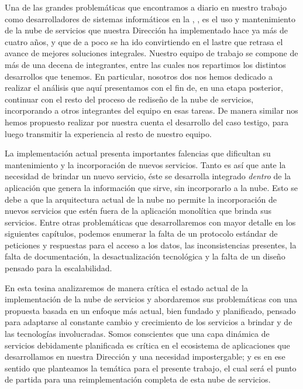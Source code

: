 
Una de las grandes problemáticas que encontramos a diario en nuestro trabajo como desarrolladores de sistemas informáticos en la \direccionDesarrollo, \unlp, es el uso y mantenimiento de la nube de servicios que nuestra Dirección ha implementado hace ya más de cuatro años, y que de a poco se ha ido convirtiendo en el lastre que retrasa el avance de mejores soluciones integrales. Nuestro equipo de trabajo se compone de más de una decena de integrantes, entre las cuales nos repartimos los distintos desarrollos que tenemos. En particular, nosotros dos nos hemos dedicado a realizar el análisis que aquí presentamos con el fin de, en una etapa posterior, continuar con el resto del proceso de rediseño de la nube de servicios, incorporando a otros integrantes del equipo en esas tareas. De manera similar nos hemos propuesto realizar por nuestra cuenta el desarrollo del caso testigo, para luego transmitir la experiencia al resto de nuestro equipo.

La implementación actual presenta importantes falencias que dificultan su mantenimiento y la incorporación de nuevos servicios. Tanto es así que ante la necesidad de brindar un nuevo servicio, éste se desarrolla integrado \textit{dentro} de la aplicación que genera la información que sirve, sin incorporarlo a la nube. Esto se debe a que la arquitectura actual de la nube no permite la incorporación de nuevos servicios que estén fuera de la aplicación monolítica que brinda sus servicios. Entre otras problemáticas que desarrollaremos con mayor detalle en los siguientes capítulos, podemos enumerar la falta de un protocolo estándar de peticiones y respuestas para el acceso a los datos, las inconsistencias presentes, la falta de documentación, la desactualización tecnológica y la falta de un diseño pensado para la escalabilidad.

En esta tesina analizaremos de manera crítica el estado actual de la implementación de la nube de servicios y abordaremos sus problemáticas con una propuesta basada en un enfoque más actual, bien fundado y planificado, pensado para adaptarse al constante cambio y crecimiento de los servicios a brindar y de las tecnologías involucradas. Somos conscientes que una capa dinámica de servicios debidamente planificada es crítica en el ecosistema de aplicaciones que desarrollamos en nuestra Dirección y una necesidad impostergable; y es en ese sentido que planteamos la temática para el presente trabajo, el cual será el punto de partida para una reimplementación completa de esta nube de servicios.
